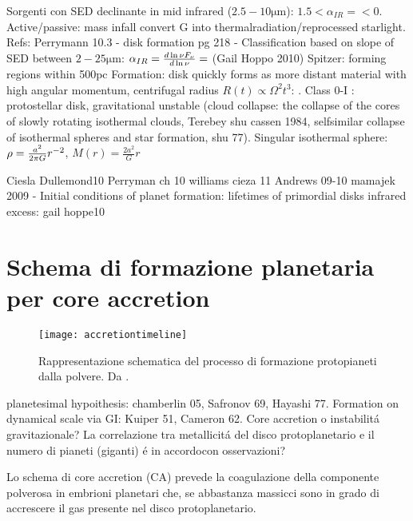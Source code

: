 \begin{workout}
Sorgenti con SED declinante in mid infrared ($2.5-10\si{\micro\meter}$): $1.5<\alpha_{IR}=<0$. Active/passive: mass infall convert G into thermalradiation/reprocessed starlight.
Refs: Perrymann 10.3 - disk formation pg 218 - 
Classification based on slope of SED between $2-25\si{\micro\meter}$: $\alpha_{IR}=\frac{d \ln{\nu F_{\nu}}}{d \ln{\nu}}=$ (Gail Hoppo 2010)
Spitzer: forming regions within 500pc
Formation: disk quickly forms as more distant material with high angular momentum, centrifugal radius $R(t)\propto\Omega^2 t^3$: . Class 0-I : protostellar disk, gravitational unstable (cloud collapse: the collapse of the cores of slowly rotating isothermal clouds, Terebey shu cassen 1984, selfsimilar collapse of isothermal spheres and star formation, shu 77). Singular isothermal sphere: $\rho=\frac{a^2}{2\pi G}r^{-2}$, $M(r)=\frac{2a^2}{G}r$
\end{workout}

\begin{workout}
Ciesla Dullemond10 
Perryman ch 10
williams cieza 11
Andrews 09-10
mamajek 2009 - Initial conditions of planet formation: lifetimes of primordial disks
infrared excess: gail hoppe10
\end{workout}


{\let\clearpage\relax\let\cleardoublepage\relax
\chapter{Schema di formazione planetaria per core accretion}
}

\begin{figure}[!t]
\texttt{[image: accretiontimeline]}\label{fig:accretiontimeline}\caption{Rappresentazione schematica del processo di formazione protopianeti dalla polvere. Da \cite{perryman2014exoplanets}.}
\end{figure}

\begin{workout}[Refs GI vs CA]
planetesimal hypoithesis: chamberlin 05, Safronov 69, Hayashi 77. Formation on dynamical scale via GI: Kuiper 51, Cameron 62.
Core accretion o instabilit\'a gravitazionale?
La correlazione tra metallicit\'a del disco protoplanetario e il numero di pianeti (giganti) \'e in accordocon osservazioni?
\end{workout}


Lo schema di core accretion (CA) prevede la coagulazione della componente polverosa in embrioni planetari che, se abbastanza massicci sono in grado di accrescere il gas presente nel disco protoplanetario.

